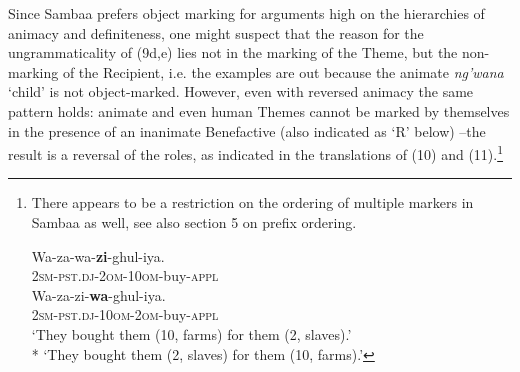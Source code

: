 \documentclass[output=paper
,modfonts
,nonflat]{langsci/langscibook}
\begin{document}
Since Sambaa prefers object marking for arguments high on the hierarchies of animacy and definiteness, one might suspect that the reason for the ungrammaticality of (9d,e) lies not in the marking of the Theme, but the non-marking of the Recipient, i.e. the examples are out because the animate \textit{ng’wana} ‘child’ is not object-marked. However, even with reversed animacy the same pattern holds: animate and even human Themes cannot be marked by themselves in the presence of an inanimate Benefactive (also indicated as ‘R’ below) –the result is a reversal of the roles, as indicated in the translations of (10) and (11).\footnote{There appears to be a restriction on the ordering of multiple markers in Sambaa as well, see also section 5 on prefix ordering.

\ea \settowidth{}
		\gll *Wa-za-wa-\textbf{zi}-ghul-iya.\\
		\textsc{2sm-pst.dj-2om-10om}-buy-\textsc{appl}	\\
\z 
\ea \settowidth{}
		\gll Wa-za-zi{}-\textbf{wa}-ghul-iya.\\
		\textsc{2sm-pst.dj-10om-2om}-buy-\textsc{appl}\\
		\glt `They bought them (10, farms) for them (2, slaves).'\\
		 * `They bought them (2, slaves) for them (10, farms).'
\z} %
\end{document}
